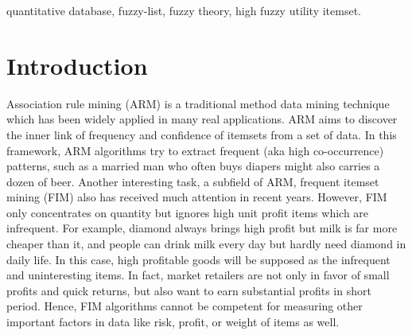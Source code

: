 \documentclass[journal]{IEEEtran}
\begin{document}
\begin{IEEEkeywords}
	quantitative database, fuzzy-list, fuzzy theory, high fuzzy utility itemset.
\end{IEEEkeywords}




\IEEEpeerreviewmaketitle


\section{Introduction}
\label{sec:introduction}

Association rule mining (ARM) \cite{karthikeyan2014survey}  is a traditional method data mining technique which has been widely applied in many real applications. ARM aims to discover the inner link of frequency and confidence of itemsets from a set of data. In this framework, ARM algorithms try to extract frequent (aka high co-occurrence)  patterns, such as a married man who often buys diapers might also carries a dozen of beer. Another interesting task, a subfield of ARM, frequent itemset mining (FIM) \cite{han2000mining, pei2007h} also has received much attention in recent years. However, FIM only concentrates on  quantity but ignores high unit profit items which are infrequent. For example, diamond always brings high profit but milk is far more cheaper than it, and people can drink milk every day but hardly need diamond in daily life. In this case, high profitable goods will be supposed as the infrequent and uninteresting items. In fact, market retailers are not only in favor of  small profits and quick returns, but also want to earn substantial profits in short period. Hence, FIM algorithms cannot be competent for measuring other important factors in data like risk, profit, or weight of items as well.
\end{document}
